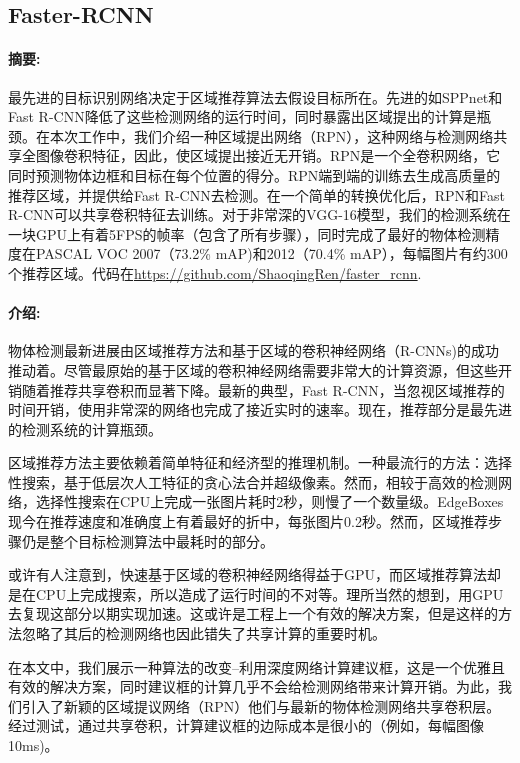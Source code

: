 \documentclass[12pt,a4paper,titlepage]{article}
\begin{document}
\subsection*{Faster-RCNN}

\paragraph {摘要:}
最先进的目标识别网络决定于区域推荐算法去假设目标所在。先进的如SPPnet和Fast R-CNN降低了这些检测网络的运行时间，同时暴露出区域提出的计算是瓶颈。在本次工作中，我们介绍一种区域提出网络（RPN），这种网络与检测网络共享全图像卷积特征，因此，使区域提出接近无开销。RPN是一个全卷积网络，它同时预测物体边框和目标在每个位置的得分。RPN端到端的训练去生成高质量的推荐区域，并提供给Fast R-CNN去检测。在一个简单的转换优化后，RPN和Fast R-CNN可以共享卷积特征去训练。对于非常深的VGG-16模型，我们的检测系统在一块GPU上有着5FPS的帧率（包含了所有步骤），同时完成了最好的物体检测精度在PASCAL VOC 2007（73.2\% mAP)和2012（70.4\% mAP），每幅图片有约300个推荐区域。代码在\url{https://github.com/ShaoqingRen/faster_rcnn}.

\paragraph{介绍:}
物体检测最新进展由区域推荐方法和基于区域的卷积神经网络（R-CNNs)的成功推动着。尽管最原始的基于区域的卷积神经网络需要非常大的计算资源，但这些开销随着推荐共享卷积而显著下降。最新的典型，Fast R-CNN，当忽视区域推荐的时间开销，使用非常深的网络也完成了接近实时的速率。现在，推荐部分是最先进的检测系统的计算瓶颈。\par

区域推荐方法主要依赖着简单特征和经济型的推理机制。一种最流行的方法：选择性搜索，基于低层次人工特征的贪心法合并超级像素。然而，相较于高效的检测网络，选择性搜索在CPU上完成一张图片耗时2秒，则慢了一个数量级。EdgeBoxes现今在推荐速度和准确度上有着最好的折中，每张图片0.2秒。然而，区域推荐步骤仍是整个目标检测算法中最耗时的部分。\par

或许有人注意到，快速基于区域的卷积神经网络得益于GPU，而区域推荐算法却是在CPU上完成搜索，所以造成了运行时间的不对等。理所当然的想到，用GPU去复现这部分以期实现加速。这或许是工程上一个有效的解决方案，但是这样的方法忽略了其后的检测网络也因此错失了共享计算的重要时机。\par

在本文中，我们展示一种算法的改变--利用深度网络计算建议框，这是一个优雅且有效的解决方案，同时建议框的计算几乎不会给检测网络带来计算开销。为此，我们引入了新颖的区域提议网络（RPN）他们与最新的物体检测网络共享卷积层。经过测试，通过共享卷积，计算建议框的边际成本是很小的（例如，每幅图像10ms)。\par
\end{document}
